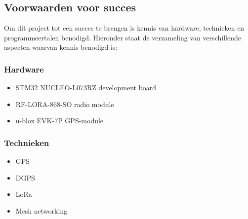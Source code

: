 \subsection{Voorwaarden voor succes}
Om dit project tot een succes te brengen is kennis van hardware, technieken
en programmeertalen benodigd. Hieronder staat de verzameling van verschillende
aspecten waarvan kennis benodigd is:
\subsubsection{Hardware}
\begin{itemize}
    \item STM32 NUCLEO-L073RZ development board
    \item RF-LORA-868-SO radio module
    \item u-blox EVK-7P GPS-module
\end{itemize}
\subsubsection{Technieken}
\begin{itemize}
    \item GPS
    \item DGPS
    \item LoRa
    \item Mesh networking
\end{itemize}
